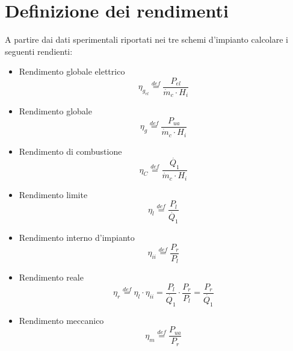 \documentclass[a4paper,12pt]{article}
\begin{document}
\section{Definizione dei rendimenti}
A partire dai dati sperimentali riportati nei tre schemi d'impianto calcolare i seguenti rendienti:
\begin{itemize}
    \item Rendimento globale elettrico
    \begin{equation}
        \label{eq:rendimento_elettrico}
        \eta_{g_{el}} \stackrel{def}{=} \frac{P_{el}}{\dot m_c \cdot H_i}
    \end{equation}
    
    \item Rendimento globale
    \begin{equation}
        \label{eq:rendimento_globale}
        \eta_g \stackrel{def}{=} \frac{P_{ua}}{\dot{m}_c \cdot H_i}
   \end{equation}

   \item Rendimento di combustione
   \begin{equation}
       \label{eq:rendimento_combustione}
       \eta_C \stackrel{def}{=} \frac{\dot{Q_1}}{\dot{m}_c \cdot H_i}
   \end{equation}

   \item Rendimento limite
   \begin{equation}
       \label{eq:redimento_limite}
       \eta_l \stackrel{def}{=} \frac{P_l}{\dot{Q_1}}
   \end{equation}

   \item Rendimento interno d'impianto
   \begin{equation}
        \label{eq:rendimento_interno}
       \eta_{ii} \stackrel{def}{=} \frac{P_r}{P_l}
   \end{equation}

   \item Rendimento reale
   \begin{equation}
       \label{eq:rendimento_reale}
       \eta_r \stackrel{def}{=} \eta_l \cdot \eta_{ii} = \frac{P_l}{\dot{Q_1}} \cdot \frac{P_r}{P_l} = \frac{P_r}{\dot{Q_1}}
   \end{equation}

   \item Rendimento meccanico
   \begin{equation}
       \label{eq:rendimento_meccanico}
       \eta_m \stackrel{def}{=} \frac{P_{ua}}{P_r}
   \end{equation}



\end{itemize}
\end{document}
